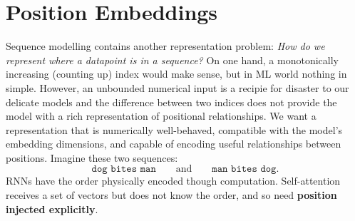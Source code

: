 


\section{Position Embeddings}
Sequence modelling contains another representation problem: \textit{How do we represent where a datapoint is in a sequence?}
On one hand, a monotonically increasing (counting up) index would make sense, but in ML world nothing in simple. 
However, an unbounded numerical input is a recipie for disaster to our delicate models and the difference between two indices does not provide the model with a rich representation of positional relationships.
We want a representation that is numerically well-behaved, compatible with the model's embedding dimensions, and capable of encoding useful relationships between positions.
Imagine these two sequences:
\[
    \texttt{dog bites man}
    \qquad\text{and}\qquad
    \texttt{man bites dog}.
\]
RNNs have the order physically encoded though computation.
Self-attention receives a set of vectors but does not know the order, and so need \textbf{position injected explicitly}.

